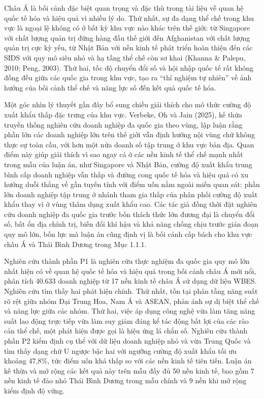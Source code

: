 \documentclass[
  a4paper,
  13pt]{extreport}
\begin{document}
Châu Á là bối cảnh đặc biệt quan trọng và đặc thù trong tài liệu về quan
hệ quốc tế hóa và hiệu quả vì nhiều lý do. Thứ nhất, sự đa dạng thể chế
trong khu vực là ngoại lệ không có ở bất kỳ khu vực nào khác trên thế
giới: từ Singapore với chất lượng quản trị đứng hàng đầu thế giới đến
Afghanistan với chất lượng quản trị cực kỳ yếu, từ Nhật Bản với nền kinh
tế phát triển hoàn thiện đến các SIDS với quy mô siêu nhỏ và hạ tầng thể
chế còn sơ khai (Khanna \& Palepu, 2010; Peng, 2003). Thứ hai, tốc độ
chuyển đổi số và hội nhập quốc tế rất không đồng đều giữa các quốc gia
trong khu vực, tạo ra ``thí nghiệm tự nhiên'' về ảnh hưởng của bối cảnh
thể chế và năng lực số đến kết quả quốc tế hóa.

Một góc nhìn lý thuyết gần đây bổ sung chiều giải thích cho mô thức
cường độ xuất khẩu thấp đặc trưng của khu vực. Verbeke, Oh và Jain
(2025), kế thừa truyền thống nghiên cứu doanh nghiệp đa quốc gia theo
vùng, lập luận rằng phần lớn các doanh nghiệp lớn trên thế giới vẫn định
hướng nội vùng chứ không thực sự toàn cầu, với hơn một nửa doanh số tập
trung ở khu vực bản địa. Quan điểm này giúp giải thích vì sao ngay cả ở
các nền kinh tế thể chế mạnh nhất trong mẫu của luận án, như Singapore
và Nhật Bản, cường độ xuất khẩu trung bình cấp doanh nghiệp vẫn thấp và
đường cong quốc tế hóa và hiệu quả có xu hướng duỗi thẳng về gần tuyến
tính với điểm uốn nằm ngoài miền quan sát: phần lớn doanh nghiệp tập
trung ở nhánh tham gia thấp của phân phối cường độ xuất khẩu thay vì ở
vùng thâm dụng xuất khẩu cao. Các tác giả đồng thời đặt nghiên cứu doanh
nghiệp đa quốc gia trước bốn thách thức lớn đương đại là chuyển đổi số,
bất ổn địa chính trị, biến đổi khí hậu và khả năng chống chịu trước gián
đoạn quy mô lớn, bốn lực mà luận án cũng định vị là bối cảnh cấp bách
cho khu vực châu Á và Thái Bình Dương trong Mục 1.1.1.

Nghiên cứu thành phần P1 là nghiên cứu thực nghiệm đa quốc gia quy mô
lớn nhất hiện có về quan hệ quốc tế hóa và hiệu quả trong bối cảnh châu
Á mới nổi, phân tích 40.633 doanh nghiệp từ 17 nền kinh tế châu Á sử
dụng dữ liệu WBES. Nghiên cứu tìm thấy hai phát hiện chính. Thứ nhất,
tồn tại phân tầng năng suất rõ rệt giữa nhóm Đại Trung Hoa, Nam Á và
ASEAN, phản ánh sự dị biệt thể chế và năng lực giữa các nhóm. Thứ hai,
việc áp dụng công nghệ vừa làm tăng năng suất lao động trực tiếp vừa làm
suy giảm đáng kể tác động bất lợi của các rào cản thể chế, một phát hiện
được gọi là hiệu ứng lá chắn số. Nghiên cứu thành phần P2 kiểm định cụ
thể với dữ liệu doanh nghiệp nhỏ và vừa Trung Quốc và tìm thấy dạng chữ
U ngược bậc hai với ngưỡng cường độ xuất khẩu tối ưu khoảng 47,8\%, tức
điểm uốn khá thấp so với các nền kinh tế tiên tiến. Luận án kế thừa và
mở rộng các kết quả này trên mẫu đầy đủ 50 nền kinh tế, bao gồm 7 nền
kinh tế đảo nhỏ Thái Bình Dương trong mẫu chính và 9 nền khi mở rộng
kiểm định độ vững.
\end{document}
